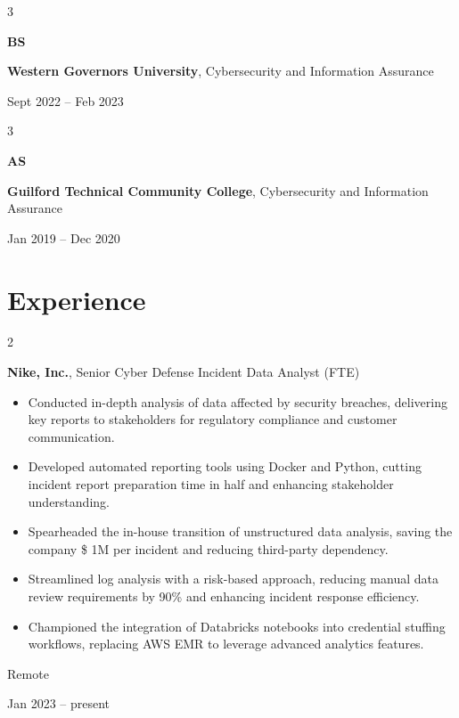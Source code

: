 \documentclass[10pt, letterpaper]{article}
\newenvironment{highlights}{
    \begin{itemize}[
        topsep=0.10 cm,
        parsep=0.10 cm,
        partopsep=0pt,
        itemsep=0pt,
        leftmargin=0.4 cm + 10pt
    ]
}{
    \end{itemize}
} %
\newenvironment{twocolentry}[2][]{
    \onecolentry
    \def\secondColumn{#2}
    \setcolumnwidth{\fill, 4.5 cm}
    \begin{paracol}{2}
}{
    \switchcolumn \raggedleft \secondColumn
    \end{paracol}
    \endonecolentry
} %
\newenvironment{threecolentry}[3][]{
    \onecolentry
    \def\thirdColumn{#3}
    \setcolumnwidth{1 cm, \fill, 4.5 cm}
    \begin{paracol}{3}
    {\raggedright #2} \switchcolumn
}{
    \switchcolumn \raggedleft \thirdColumn
    \end{paracol}
    \endonecolentry
} %
\begin{document}
        \vspace{0.2 cm}

        \begin{threecolentry}{\textbf{BS}}{
            Sept 2022 – Feb 2023
        }
            \textbf{Western Governors University}, Cybersecurity and Information Assurance
        \end{threecolentry}

        \vspace{0.2 cm}

        \begin{threecolentry}{\textbf{AS}}{
            Jan 2019 – Dec 2020
        }
            \textbf{Guilford Technical Community College}, Cybersecurity and Information Assurance
        \end{threecolentry}


    
    \section{Experience}



        
        \begin{twocolentry}{
            Remote

        Jan 2023 – present
        }
            \textbf{Nike, Inc.}, Senior Cyber Defense Incident Data Analyst (FTE)
            \begin{highlights}
                \item Conducted in-depth analysis of data affected by security breaches, delivering key reports to stakeholders for regulatory compliance and customer communication.
                \item Developed automated reporting tools using Docker and Python, cutting incident report preparation time in half and enhancing stakeholder understanding.
                \item Spearheaded the in-house transition of unstructured data analysis, saving the company \$ 1M per incident and reducing third-party dependency.
                \item Streamlined log analysis with a risk-based approach, reducing manual data review requirements by 90\% and enhancing incident response efficiency.
                \item Championed the integration of Databricks notebooks into credential stuffing workflows, replacing AWS EMR to leverage advanced analytics features.
            \end{highlights}
        \end{twocolentry}
\end{document}
